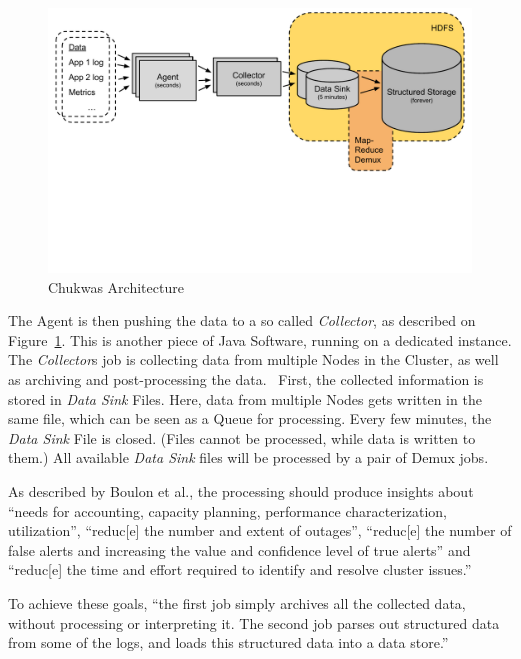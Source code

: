 \begin{figure}[hbt]
  \centering
  \includegraphics[width=\linewidth,clip=true,trim=0 6cm 0 0]{images/ChukwaArchitecture}
  \caption{Chukwas Architecture~\cite{Rabkin2008}}
  \label{fig:ChukwaArchitecture}
\end{figure}

The Agent is then pushing the data to a so called \textit{Collector}, as described on Figure~\ref{fig:ChukwaArchitecture}.
This is another piece of Java Software, running on a dedicated \chuk instance. 
The \textit{Collector}s job is collecting data from multiple Nodes in the Cluster, as well as archiving and post-processing the data.~\cite{Jose2014}
First, the collected information is stored in \textit{Data Sink} Files. 
Here, data from multiple Nodes gets written in the same file, which can be seen as a Queue for processing.
Every few minutes, the \textit{Data Sink} File is closed. (Files cannot be processed, while data is written to them.)
All available \textit{Data Sink} files will be processed by a pair of Demux \mr jobs.~\cite{Boulona} 


As described by Boulon et al., the \mr processing should produce insights about ``needs for accounting, capacity planning, performance characterization, utilization'', ``reduc[e] the number and extent of outages'', ``reduc[e] the number of false alerts and increasing the value and confidence level of true alerts'' and ``reduc[e] the time and effort required to identify and resolve cluster issues.''\cite{Boulonb}

To achieve these goals, ``the first job simply archives all the collected data, without processing or interpreting it. The second job parses out structured data from some of the logs, and loads this structured data into a data store.''~\cite{Boulona} 

